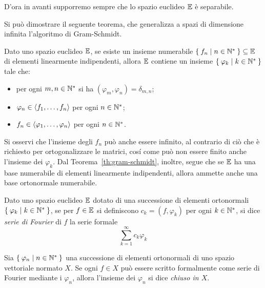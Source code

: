 	D'ora in avanti supporremo sempre che lo spazio euclideo \(\mathbb{E}\) è separabile.
	
	Si può dimostrare il seguente teorema, che generalizza a spazi di dimensione infinita l'algoritmo di Gram-Schmidt.
	
	\begin{teorema}\label{th:gram-schmidt}
		Dato uno spazio euclideo \(\mathbb{E}\), se esiste un insieme numerabile \(\Set{f_n | n \in \mathbb{N}^*} \subseteq \mathbb{E}\) di elementi linearmente indipendenti, allora \(\mathbb{E}\) contiene un insieme \(\Set{\varphi_k | k \in \mathbb{N}^*}\) tale che:
		\begin{itemize}
			\item per ogni \(m, n \in \mathbb{N}^*\) si ha \((\varphi_m, \varphi_n) = \delta_{m, n}\);
			\item \(\varphi_n \in \Braket{f_1, \dots, f_n}\) per ogni \(n \in \mathbb{N}^*\);
			\item \(f_n \in \Braket{\varphi_1, \dots, \varphi_n}\) per ogni \(n \in \mathbb{N}^*\).
		\end{itemize}
	\end{teorema}

	Si osservi che l'insieme degli \(f_n\) può anche essere infinito, al contrario di ciò che è richiesto per ortogonalizzare le matrici, cosí come può non essere finito anche l'insieme dei \(\varphi_k\). Dal Teorema~\ref{th:gram-schmidt}, inoltre, segue che se \(\mathbb{E}\) ha una base numerabile di elementi linearmente indipendenti, allora ammette anche una base ortonormale numerabile.
	
	\begin{definizione}\label{def:serie-fourier}
		Dato uno spazio euclideo \(\mathbb{E}\) dotato di una successione di elementi ortonormali \(\Set{\varphi_k | k \in \mathbb{N}^*}\), se per \(f \in \mathbb{E}\) si definiscono \(c_k = (f, \varphi_k)\) per ogni \(k \in \mathbb{N}^*\), si dice \emph{serie di Fourier} di \(f\) la serie formale
		\begin{equation}\label{eq:serie-fourier}
			\sum_{k = 1}^\infty c_k \varphi_k
		\end{equation}
	\end{definizione}

	\begin{definizione}\label{def:chiuso}
		Sia \(\Set{\varphi_n | n \in \mathbb{N}^*}\) una successione di elementi ortonormali di uno spazio vettoriale normato \(X\). Se ogni \(f \in X\) può essere scritto formalmente come serie di Fourier mediante i \(\varphi_n\), allora l'insieme dei \(\varphi_n\) si dice \emph{chiuso in \(X\)}.
	\end{definizione}

